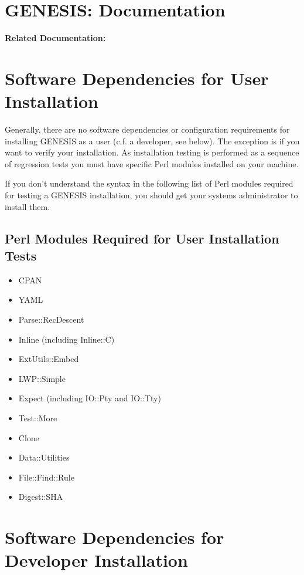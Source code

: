 \documentclass[12pt]{article}
\begin{document}
\section*{GENESIS: Documentation}

{\bf Related Documentation:}

\section*{Software Dependencies for User Installation}

Generally, there are no software dependencies or configuration requirements for installing GENESIS as a user (c.f. a developer, see below). The exception is if you want to verify your installation. As installation testing is performed as a sequence of regression tests you must have specific Perl modules installed on your machine.

If you don't understand the syntax in the following list of Perl modules required for testing a GENESIS installation, you should get your systems administrator to install them. 

\subsection*{Perl Modules Required for User Installation Tests}
\begin{itemize}
   \item CPAN
   \item YAML
   \item Parse::RecDescent
   \item Inline (including Inline::C)
   \item ExtUtils::Embed
   \item LWP::Simple
   \item Expect (including IO::Pty and IO::Tty)
   \item Test::More
   \item Clone
   \item Data::Utilities
   \item File::Find::Rule
   \item Digest::SHA
\end{itemize}

\section*{Software Dependencies for Developer Installation}
\end{document}
